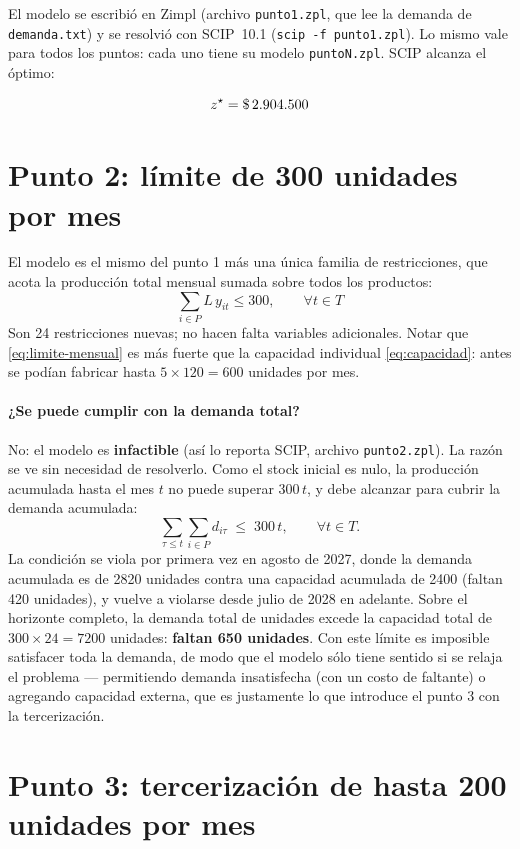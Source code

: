 \documentclass[11pt,a4paper]{article}
\begin{document}
El modelo se escribió en Zimpl (archivo \texttt{punto1.zpl}, que lee la demanda
de \texttt{demanda.txt}) y se resolvió con SCIP~10.1 (\texttt{scip -f
punto1.zpl}). Lo mismo vale para todos los puntos: cada uno tiene su modelo
\texttt{puntoN.zpl}. SCIP alcanza el óptimo:

\[
  z^{\star} = \$\,2.904.500
\]

\section*{Punto 2: límite de 300 unidades por mes}

El modelo es el mismo del punto 1 más una única familia de restricciones, que
acota la producción total mensual sumada sobre todos los productos:
\begin{equation}
  \sum_{i \in P} L\,y_{it} \le 300, \qquad \forall t \in T
  \label{eq:limite-mensual}
\end{equation}
Son 24 restricciones nuevas; no hacen falta variables adicionales. Notar que
\eqref{eq:limite-mensual} es más fuerte que la capacidad individual
\eqref{eq:capacidad}: antes se podían fabricar hasta $5\times120=600$ unidades
por mes.

\paragraph{¿Se puede cumplir con la demanda total?} No: el modelo es
\textbf{infactible} (así lo reporta SCIP, archivo \texttt{punto2.zpl}). La
razón se ve sin necesidad de resolverlo. Como el stock inicial es nulo, la
producción acumulada hasta el mes $t$ no puede superar $300\,t$, y debe alcanzar
para cubrir la demanda acumulada:
\[
  \sum_{\tau \le t} \sum_{i \in P} d_{i\tau} \;\le\; 300\,t,
  \qquad \forall t \in T .
\]
La condición se viola por primera vez en agosto de 2027, donde la demanda
acumulada es de 2820 unidades contra una capacidad acumulada de 2400 (faltan 420
unidades), y vuelve a violarse desde julio de 2028 en adelante. Sobre el
horizonte completo, la demanda total de \demandaTotal{} unidades excede la
capacidad total de $300 \times 24 = 7200$ unidades: \textbf{faltan 650
unidades}. Con este límite es imposible satisfacer toda la demanda, de modo que
el modelo sólo tiene sentido si se relaja el problema --- permitiendo demanda
insatisfecha (con un costo de faltante) o agregando capacidad externa, que es
justamente lo que introduce el punto 3 con la tercerización.

\section*{Punto 3: tercerización de hasta 200 unidades por mes}
\end{document}
